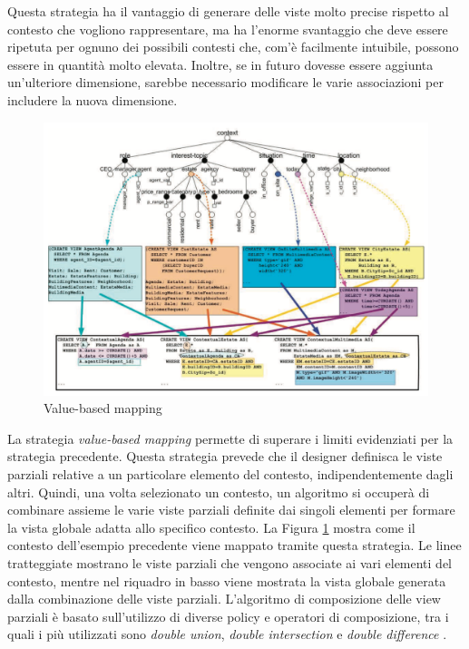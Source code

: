 Questa strategia ha il vantaggio di generare delle viste molto precise rispetto al contesto che vogliono rappresentare, ma ha l'enorme svantaggio che deve essere ripetuta per ognuno dei possibili contesti che, com'è facilmente intuibile, possono essere in quantità molto elevata. Inoltre, se in futuro dovesse essere aggiunta un'ulteriore dimensione, sarebbe necessario modificare le varie associazioni per includere la nuova dimensione.

\begin{figure}[ht]
	\centering
	\includegraphics[width=\textwidth]{2-nozioni-preliminari/Immagini/value-based-mapping.png}
	\caption{Value-based mapping}\label{fig:value-based-mapping}
\end{figure}

La strategia \emph{value-based mapping} permette di superare i limiti evidenziati per la strategia precedente. Questa strategia prevede che il designer definisca le viste parziali relative a un particolare elemento del contesto, indipendentemente dagli altri. Quindi, una volta selezionato un contesto, un algoritmo si occuperà di combinare assieme le varie viste parziali definite dai singoli elementi per formare la vista globale adatta allo specifico contesto. La Figura \ref{fig:value-based-mapping} mostra come il contesto dell'esempio precedente viene mappato tramite questa strategia. Le linee tratteggiate mostrano le viste parziali che vengono associate ai vari elementi del contesto, mentre nel riquadro in basso viene mostrata la vista globale generata dalla combinazione delle viste parziali. L'algoritmo di composizione delle view parziali è basato sull'utilizzo di diverse policy e operatori di composizione, tra i quali i più utilizzati sono \emph{double union}, \emph{double intersection} e \emph{double difference} \cite{DBLP:conf/er/BolchiniQR07}.

